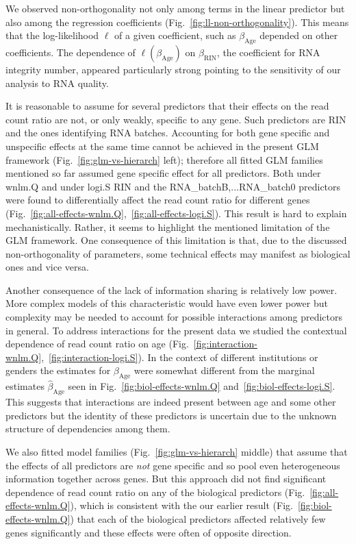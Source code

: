\documentclass[letterpaper]{article}
\begin{document}
We observed non-orthogonality not only among terms in the linear predictor but
also among the regression coefficients (Fig.~\ref{fig:ll-non-orthogonality}).
This means that the log-likelihood \(\ell\) of a given coefficient, such as
\(\beta_\mathrm{Age}\) depended on other coefficients.  The dependence of
\(\ell(\beta_\mathrm{Age})\) on \(\beta_\mathrm{RIN}\), the coefficient for
RNA integrity number, appeared particularly strong pointing to the sensitivity
of our analysis to RNA quality.

It is reasonable to assume for several predictors that their effects on the
read count ratio are not, or only weakly, specific to any gene.  Such predictors are RIN
and the ones identifying RNA batches.  Accounting for both gene specific and
unspecific effects at the same time cannot be achieved in the present GLM
framework (Fig.~\ref{fig:glm-vs-hierarch} left); therefore all fitted GLM
families mentioned so far assumed gene specific effect for all predictors.
Both under wnlm.Q and under logi.S RIN and the RNA\_batchB,...RNA\_batch0
predictors were found to differentially affect the read count ratio for
different genes
(Fig.~\ref{fig:all-effects-wnlm.Q},~\ref{fig:all-effects-logi.S}).  This result
is hard to explain mechanistically.  Rather, it seems to highlight the
mentioned limitation of the GLM framework.  One consequence of this limitation
is that, due to the discussed non-orthogonality of parameters, some technical
effects may manifest as biological ones and vice versa.

Another consequence of the lack of information sharing is relatively low
power.  More complex models of this characteristic would have even lower power
but complexity may be needed to account for possible interactions among predictors in
general.  To address interactions for the present data we studied the contextual
dependence of read count ratio on age
(Fig.~\ref{fig:interaction-wnlm.Q},~\ref{fig:interaction-logi.S}).  In the
context of different institutions or genders the estimates for
\(\beta_\mathrm{Age}\) were somewhat different from the marginal estimates
\(\hat\beta_\mathrm{Age}\) seen in Fig.~\ref{fig:biol-effects-wnlm.Q}
and~\ref{fig:biol-effects-logi.S}.  This suggests that interactions are indeed
present between age and some other predictors but the identity of these
predictors is uncertain due to the unknown structure of dependencies among them.

We also fitted model families (Fig.~\ref{fig:glm-vs-hierarch} middle) that
assume that the effects of all predictors are \emph{not} gene specific and so
pool even heterogeneous information together across genes.  But this approach
did not find significant dependence of read count ratio on any of the
biological predictors (Fig.~\ref{fig:all-effects-wnlm.Q}), which is consistent
with the our earlier result (Fig.~\ref{fig:biol-effects-wnlm.Q}) that each of
the biological predictors affected relatively few genes significantly and these
effects were often of opposite direction.
\end{document}
